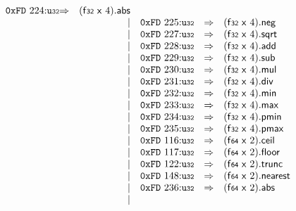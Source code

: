 $$\begin{array}{@{}l@{}rrlll@{}l@{}}
\mathtt{0xFD}~224{:}{\mathtt{u{\scriptstyle32}}} &\Rightarrow& (\mathsf{f{\scriptstyle32}}~\mathsf{x}~4) . \mathsf{abs} \\ &&|&
\mathtt{0xFD}~225{:}{\mathtt{u{\scriptstyle32}}} &\Rightarrow& (\mathsf{f{\scriptstyle32}}~\mathsf{x}~4) . \mathsf{neg} \\ &&|&
\mathtt{0xFD}~227{:}{\mathtt{u{\scriptstyle32}}} &\Rightarrow& (\mathsf{f{\scriptstyle32}}~\mathsf{x}~4) . \mathsf{sqrt} \\ &&|&
\mathtt{0xFD}~228{:}{\mathtt{u{\scriptstyle32}}} &\Rightarrow& (\mathsf{f{\scriptstyle32}}~\mathsf{x}~4) . \mathsf{add} \\ &&|&
\mathtt{0xFD}~229{:}{\mathtt{u{\scriptstyle32}}} &\Rightarrow& (\mathsf{f{\scriptstyle32}}~\mathsf{x}~4) . \mathsf{sub} \\ &&|&
\mathtt{0xFD}~230{:}{\mathtt{u{\scriptstyle32}}} &\Rightarrow& (\mathsf{f{\scriptstyle32}}~\mathsf{x}~4) . \mathsf{mul} \\ &&|&
\mathtt{0xFD}~231{:}{\mathtt{u{\scriptstyle32}}} &\Rightarrow& (\mathsf{f{\scriptstyle32}}~\mathsf{x}~4) . \mathsf{div} \\ &&|&
\mathtt{0xFD}~232{:}{\mathtt{u{\scriptstyle32}}} &\Rightarrow& (\mathsf{f{\scriptstyle32}}~\mathsf{x}~4) . \mathsf{min} \\ &&|&
\mathtt{0xFD}~233{:}{\mathtt{u{\scriptstyle32}}} &\Rightarrow& (\mathsf{f{\scriptstyle32}}~\mathsf{x}~4) . \mathsf{max} \\ &&|&
\mathtt{0xFD}~234{:}{\mathtt{u{\scriptstyle32}}} &\Rightarrow& (\mathsf{f{\scriptstyle32}}~\mathsf{x}~4) . \mathsf{pmin} \\ &&|&
\mathtt{0xFD}~235{:}{\mathtt{u{\scriptstyle32}}} &\Rightarrow& (\mathsf{f{\scriptstyle32}}~\mathsf{x}~4) . \mathsf{pmax} \\ &&|&
\mathtt{0xFD}~116{:}{\mathtt{u{\scriptstyle32}}} &\Rightarrow& (\mathsf{f{\scriptstyle64}}~\mathsf{x}~2) . \mathsf{ceil} \\ &&|&
\mathtt{0xFD}~117{:}{\mathtt{u{\scriptstyle32}}} &\Rightarrow& (\mathsf{f{\scriptstyle64}}~\mathsf{x}~2) . \mathsf{floor} \\ &&|&
\mathtt{0xFD}~122{:}{\mathtt{u{\scriptstyle32}}} &\Rightarrow& (\mathsf{f{\scriptstyle64}}~\mathsf{x}~2) . \mathsf{trunc} \\ &&|&
\mathtt{0xFD}~148{:}{\mathtt{u{\scriptstyle32}}} &\Rightarrow& (\mathsf{f{\scriptstyle64}}~\mathsf{x}~2) . \mathsf{nearest} \\ &&|&
\mathtt{0xFD}~236{:}{\mathtt{u{\scriptstyle32}}} &\Rightarrow& (\mathsf{f{\scriptstyle64}}~\mathsf{x}~2) . \mathsf{abs} \\ &&|&

\end{array}$$
